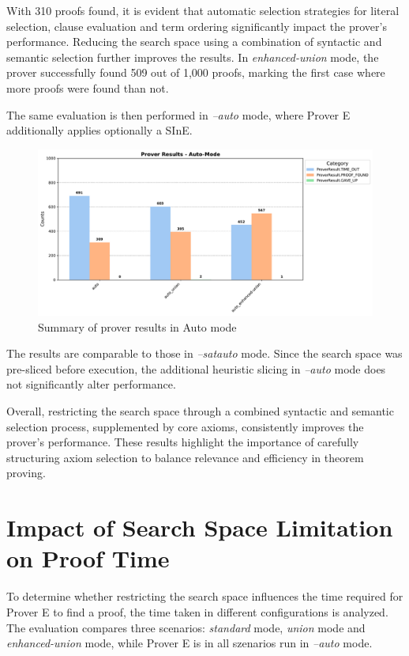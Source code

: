 \documentclass[english,version-2020-11]{uzl-thesis}
\begin{document}
With 310 proofs found, it is evident that automatic selection strategies for literal selection, clause evaluation and term ordering significantly impact the prover's performance. Reducing the search space using a combination of syntactic and semantic selection further improves the results. In \textit{enhanced-union} mode, the prover successfully found 509 out of 1,000 proofs, marking the first case where more proofs were found than not.

The same evaluation is then performed in \textit{--auto} mode, where Prover E additionally applies optionally a SInE.

\begin{figure}[h!]
    \centering
    \includegraphics[width=\textwidth]{auto_mode_output.pdf}
    \caption{Summary of prover results in Auto mode}
    \label{fig:prover_results_auto}
\end{figure}
\FloatBarrier

The results are comparable to those in \textit{--satauto} mode. Since the search space was pre-sliced before execution, the additional heuristic slicing in \textit{--auto} mode does not significantly alter performance.

Overall, restricting the search space through a combined syntactic and semantic selection process, supplemented by core axioms, consistently improves the prover’s performance. These results highlight the importance of carefully structuring axiom selection to balance relevance and efficiency in theorem proving.

\section{Impact of Search Space Limitation on Proof Time}

To determine whether restricting the search space influences the time required for Prover E to find a proof, the time taken in different configurations is analyzed. The evaluation compares three scenarios: \textit{standard} mode, \textit{union} mode and \textit{enhanced-union} mode, while Prover E is in all szenarios run in \textit{--auto} mode.
\end{document}
